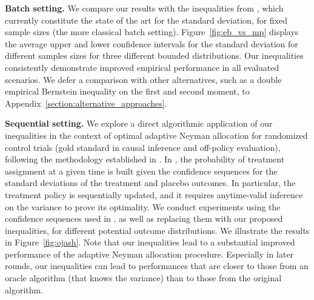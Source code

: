 \textbf{Batch setting.} We compare our results with 
the inequalities from \citet[Theorem 10]{maurer2009empirical}, which currently constitute the state of the art for the standard deviation, for fixed sample sizes (the more classical batch setting). Figure~\ref{fig:eb_vs_mp} displays the average upper and lower confidence intervals for the standard deviation for different samples sizes for three different bounded distributions. Our inequalities consistently demonstrate improved empirical performance in all evaluated scenarios.  We defer a comparison with other alternatives, such as a double empirical Bernstein inequality on the first and second moment, to Appendix~\ref{section:alternative_approaches}. 




\textbf{Sequential setting.} We explore a direct algorithmic application of our inequalities in the context of optimal adaptive Neyman allocation for randomized control trials (gold standard in causal inference and off-policy evaluation), following the methodology established in \citet{neopane2025optimistic}. In \citet{neopane2025optimistic}, the probability of treatment assignment at a given time is built given the confidence sequences for the standard deviations of the treatment and placebo outcomes. In particular, the treatment policy is sequentially updated, and it requires anytime-valid inference on the variance to prove its optimality. We conduct experiments using the confidence sequences used in \citet{neopane2025optimistic}, %
as well as replacing them with our proposed inequalities, for different potential outcome distributions. We illustrate the results in Figure~\ref{fig:ojash}. Note that our inequalities lead to a substantial improved performance of the adaptive Neyman allocation procedure. Especially in later rounds, our inequalities can lead to performances that are closer to those from an oracle algorithm (that knows the variance) than to those from the original algorithm. 





    

 






